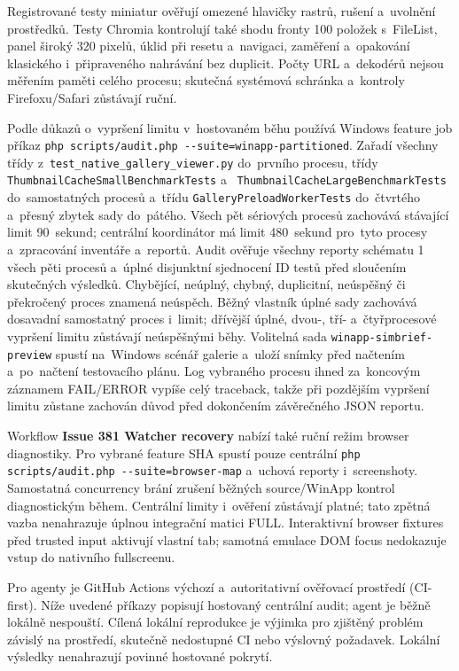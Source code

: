 \documentclass[11pt,a4paper]{article}
\newcommand{\ui}[1]{\textbf{#1}}
\newcommand{\codeword}[1]{\nolinkurl{#1}}
\begin{document}
Registrované testy miniatur ověřují omezené hlavičky rastrů, rušení a~uvolnění
prostředků. Testy Chromia kontrolují také shodu fronty 100 položek s~FileList,
panel široký 320 pixelů, úklid při resetu a~navigaci, zaměření a~opakování
klasického i~připraveného nahrávání bez duplicit. Počty URL a~dekodérů nejsou
měřením paměti celého procesu; skutečná systémová schránka a~kontroly
Firefoxu/Safari zůstávají ruční.

Podle důkazů o~vypršení limitu v~hostovaném běhu používá Windows feature job
příkaz \codeword{php scripts/audit.php --suite=winapp-partitioned}. Zařadí
všechny třídy z~\codeword{test_native_gallery_viewer.py} do~prvního procesu,
třídy \codeword{ThumbnailCacheSmallBenchmarkTests} a~
\codeword{ThumbnailCacheLargeBenchmarkTests} do~samostatných procesů
a~třídu \codeword{GalleryPreloadWorkerTests} do~čtvrtého a~přesný zbytek sady
do~pátého. Všech pět sériových procesů zachovává stávající limit 90~sekund;
centrální koordinátor má limit 480~sekund
pro~tyto procesy a~zpracování inventáře a~reportů. Audit ověřuje všechny
reporty schématu 1 všech pěti procesů a~úplné disjunktní sjednocení ID testů
před sloučením skutečných výsledků.
Chybějící, neúplný, chybný, duplicitní, neúspěšný či překročený proces znamená
neúspěch. Běžný vlastník úplné sady zachovává dosavadní samostatný proces
i~limit; dřívější úplné, dvou-, tří- a~čtyřprocesové vypršení limitu zůstávají
neúspěšnými běhy.
Volitelná sada \codeword{winapp-simbrief-preview} spustí na~Windows scénář
galerie a~uloží snímky před načtením a~po~načtení testovacího plánu.
Log vybraného procesu ihned za~koncovým záznamem FAIL/ERROR vypíše celý
traceback, takže při pozdějším vypršení limitu zůstane zachován důvod před
dokončením závěrečného JSON reportu.

Workflow \ui{Issue 381 Watcher recovery} nabízí také ruční režim browser
diagnostiky. Pro vybrané feature SHA spustí pouze centrální
\codeword{php scripts/audit.php --suite=browser-map} a~uchová reporty
i~screenshoty. Samostatná concurrency brání zrušení běžných source/WinApp
kontrol diagnostickým během. Centrální limity i~ověření zůstávají platné;
tato zpětná vazba nenahrazuje úplnou integrační matici FULL.
Interaktivní browser fixtures před trusted input aktivují vlastní tab;
samotná emulace DOM focus nedokazuje vstup do nativního fullscreenu.

Pro agenty je GitHub Actions výchozí a~autoritativní ověřovací prostředí
(CI-first). Níže uvedené příkazy popisují hostovaný centrální audit; agent je
běžně lokálně nespouští. Cílená lokální reprodukce je výjimka pro zjištěný
problém závislý na prostředí, skutečně nedostupné CI nebo výslovný požadavek.
Lokální výsledky nenahrazují povinné hostované pokrytí.
\end{document}
